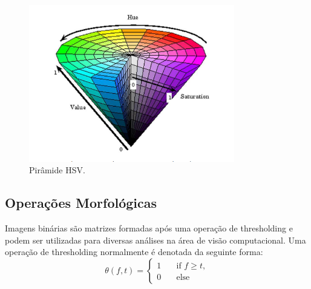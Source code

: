 \begin{figure}[ht]
    \centering
    \includegraphics[width=0.8\textwidth]{capitulos/cores_hsv.png}
    \caption{Pirâmide HSV. \cite{erdogan2014shifting}}
    \label{fig:cores_hsv}
\end{figure}

\subsection{Operações Morfológicas}

Imagens binárias são matrizes formadas após uma operação de thresholding e podem ser utilizadas para diversas análises na área de visão computacional. Uma operação de thresholding normalmente é denotada da seguinte forma:
\begin{equation}
    \theta(f,t) = 
  \begin{cases}
    1       & \quad \text{if } f \geq t,\\
    0  & \quad \text{else}
  \end{cases}
    \label{eq:thresholding}
\end{equation}

